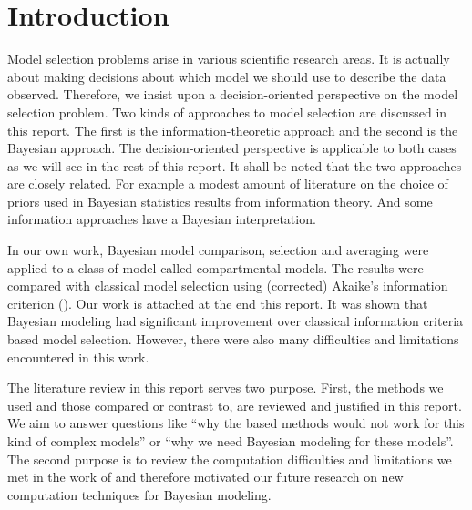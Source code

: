 \chapter{Introduction}
\label{cha:Introduction}

Model selection problems arise in various scientific research areas. It is
actually about making decisions about which model we should use to describe
the data observed. Therefore, we insist upon a decision-oriented perspective
on the model selection problem. Two kinds of approaches to model selection are
discussed in this report. The first is the information-theoretic approach and
the second is the Bayesian approach. The decision-oriented perspective is
applicable to both cases as we will see in the rest of this report. It shall
be noted that the two approaches are closely related. For example a modest
amount of literature on the choice of priors used in Bayesian statistics
results from information theory. And some information approaches have a
Bayesian interpretation.

\firstyear
In our own work, Bayesian model comparison, selection and averaging were
applied to a class of model called compartmental models. The results were
compared with classical model selection using (corrected) Akaike's information
criterion (\aicc). Our work is attached at the end this report. It was shown
that Bayesian modeling had significant improvement over classical information
criteria based model selection. However, there were also many difficulties and
limitations encountered in this work.
\endfirstyear

The literature review in this report serves two purpose. First, the methods we
used and those compared or contrast to, are reviewed and justified in this
report. We aim to answer questions like ``why the \aic based methods would not
work for this kind of complex models'' or ``why we need Bayesian modeling for
these models''. The second purpose is to review the computation difficulties
and limitations we met in the work of \textcite{Zhou2011} and therefore
motivated our future research on new computation techniques for Bayesian
modeling.

